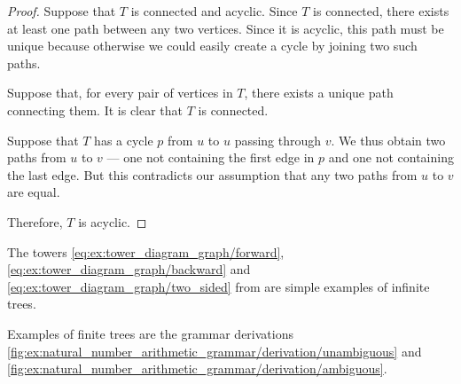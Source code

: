 \begin{proof}
   Suppose that \( T \) is connected and acyclic. Since \( T \) is connected, there exists at least one path between any two vertices. Since it is acyclic, this path must be unique because otherwise we could easily create a cycle by joining two such paths.

   Suppose that, for every pair of vertices in \( T \), there exists a unique path connecting them. It is clear that \( T \) is connected.

  Suppose that \( T \) has a cycle \( p \) from \( u \) to \( u \) passing through \( v \). We thus obtain two paths from \( u \) to \( v \) --- one not containing the first edge in \( p \) and one not containing the last edge. But this contradicts our assumption that any two paths from \( u \) to \( v \) are equal.

  Therefore, \( T \) is acyclic.
\end{proof}

\begin{example}\label{ex:def:tree}
  The towers \eqref{eq:ex:tower_diagram_graph/forward}, \eqref{eq:ex:tower_diagram_graph/backward} and \eqref{eq:ex:tower_diagram_graph/two_sided} from  are simple examples of infinite trees.

  Examples of finite trees are the grammar derivations \cref{fig:ex:natural_number_arithmetic_grammar/derivation/unambiguous} and \cref{fig:ex:natural_number_arithmetic_grammar/derivation/ambiguous}.
\end{example}

